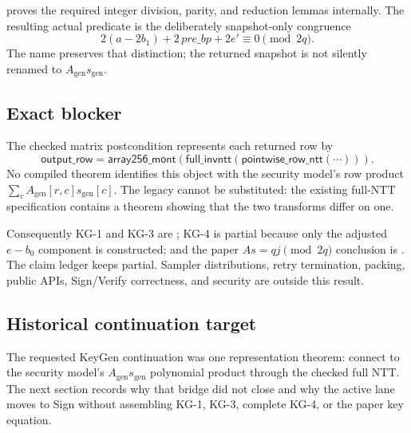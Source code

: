  proves the required integer division,
parity, and reduction lemmas internally.  The resulting actual predicate is
the deliberately snapshot-only congruence
\[
 2(a-2b_1)+2\,\mathit{pre\_bp}+2e'\equiv0\pmod {2q}.
\]
The name  preserves that distinction;
the returned snapshot is not silently renamed to
\(A_{\mathrm{gen}}s_{\mathrm{gen}}\).

\subsection*{Exact blocker}

The checked matrix postcondition represents each returned row by
\[
 \mathsf{output\_row}
 =\mathsf{array256\_mont}
   (\mathsf{full\_invntt}(\mathsf{pointwise\_row\_ntt}(\cdots))).
\]
No compiled theorem identifies this object with the security model's row
product \(\sum_c A_{\mathrm{gen}}[r,c]s_{\mathrm{gen}}[c]\).  The legacy
 cannot be substituted: the existing full-NTT specification
contains a theorem showing that the two transforms differ on one.

Consequently KG-1 and KG-3 are ; KG-4 is partial because only
the adjusted \(e-b_0\) component is constructed; and the paper
\(A s=qj\pmod {2q}\) conclusion is .  The claim ledger keeps
 partial.  Sampler distributions, retry
termination, packing, public APIs, Sign/Verify correctness, and security are
outside this result.

\subsection*{Historical continuation target}

The requested KeyGen continuation was one representation theorem: connect
 to the security model's
\(A_{\mathrm{gen}}s_{\mathrm{gen}}\) polynomial product through the checked
full NTT.  The next section records why that bridge did not close and why the
active lane moves to Sign without assembling KG-1, KG-3, complete KG-4, or
the paper key equation.
